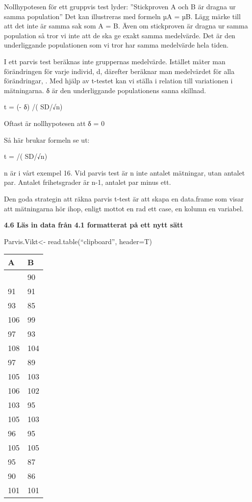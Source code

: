 \documentclass[
  letterpaper,
  DIV=11,
  numbers=noendperiod]{scrartcl}
\begin{document}
Nollhypotesen för ett gruppvis test lyder: ''Stickproven A och B är
dragna ur samma population'' Det kan illustreras med formeln µA = µB.
Lägg märke till att det inte är samma sak som A = B. Även om stickproven
är dragna ur samma population så tror vi inte att de ska ge exakt samma
medelvärde. Det är den underliggande populationen som vi tror har samma
medelvärde hela tiden.

I ett parvis test beräknas inte gruppernas medelvärde. Istället mäter
man förändringen för varje individ, d, därefter beräknar man medelvärdet
för alla förändringar, . Med hjälp av t-testet kan vi ställa i relation
till variationen i mätningarna. δ är den underliggande populationens
sanna skillnad.

t = (- δ) /( SD/√n)

Oftast är nollhypotesen att δ = 0

Så här brukar formeln se ut:

t = /( SD/√n)

n är i vårt exempel 16. Vid parvis test är n inte antalet mätningar,
utan antalet par. Antalet frihetsgrader är n-1, antalet par minus ett.

Den goda strategin att räkna parvis t-test är att skapa en data.frame
som visar att mätningarna hör ihop, enligt mottot en rad ett case, en
kolumn en variabel.

\textbf{4.6 Läs in data från 4.1 formatterat på ett nytt sätt}

Parvis.Vikt\textless- read.table(``clipboard'', header=T)

\begin{longtable}[]{@{}ll@{}}
\toprule\noalign{}
A & B \\
\midrule\noalign{}
\endhead
\bottomrule\noalign{}
\endlastfoot
90 & 90 \\
91 & 91 \\
93 & 85 \\
106 & 99 \\
97 & 93 \\
108 & 104 \\
97 & 89 \\
105 & 103 \\
106 & 102 \\
103 & 95 \\
105 & 103 \\
96 & 95 \\
105 & 105 \\
95 & 87 \\
90 & 86 \\
101 & 101 \\
\end{longtable}
\end{document}
